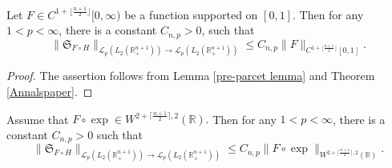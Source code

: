 \documentclass[12pt]{amsart}
\begin{document}
\begin{lemma}\label{post-parcet lemma} Let $F\in C^{1+\lfloor\frac{n+1}{2}\rfloor}[0,\infty)$ be a function supported on $[0,1].$ Then for any $1<p<\infty$, there is a constant $C_{n,p}>0$, such that
$$\|\mathfrak{S}_{F\circ H}\|_{\mathcal{L}_p(L_2(\mathbb{R}^{n+1}_+))\to \mathcal{L}_p(L_2(\mathbb{R}^{n+1}_+))}\leq C_{n,p}\|F\|_{C^{1+\lfloor\frac{n+1}{2}\rfloor}[0,1]}.$$
\end{lemma}
\begin{proof} The assertion follows from Lemma \ref{pre-parcet lemma} and Theorem \ref{Annalspaper}.
\end{proof}
\begin{lemma}\label{post-denis lemma} Assume that $F\circ\exp\in W^{2+\lceil\frac{n+1}{2}\rceil,2}(\mathbb{R}).$ Then for any $1<p<\infty$, there is a constant $C_{n,p}>0$ such that
$$\|\mathfrak{S}_{F\circ H}\|_{\mathcal{L}_p(L_2(\mathbb{R}^{n+1}_+))\to \mathcal{L}_p(L_2(\mathbb{R}^{n+1}_+))}\leq C_{n,p}\|F\circ\exp\|_{W^{2+\lceil\frac{n+1}{2}\rceil,2}(\mathbb{R})}.$$
\end{lemma}
\end{document}

